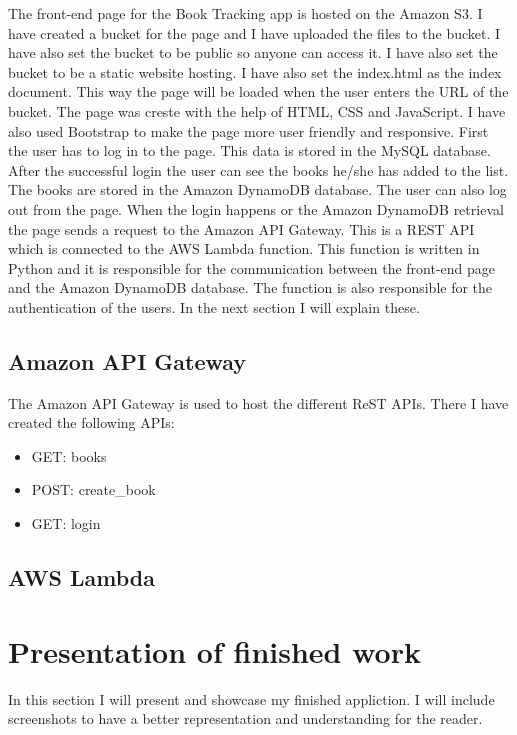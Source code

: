 \documentclass[11pt,a4paper,oneside]{report}
\begin{document}
The front-end page for the Book Tracking app is hosted on the Amazon S3. I have created a bucket for the page and I have uploaded the files to the bucket. I have also set the bucket to be public so anyone can access it. I have also set the bucket to be a static website hosting. I have also set the index.html as the index document. This way the page will be loaded when the user enters the URL of the bucket.
The page was creste with the help of HTML, CSS and JavaScript. I have also used Bootstrap to make the page more user friendly and responsive. First the user has to log in to the page.
This data is stored in the MySQL database. After the successful login the user can see the books he/she has added to the list.
The books are stored in the Amazon DynamoDB database. The user can also log out from the page.
When the login happens or the Amazon DynamoDB retrieval the page sends a request to the Amazon API Gateway. This is a REST API which is connected to the AWS Lambda function. This function is written in Python and it is responsible for the communication between the front-end page and the Amazon DynamoDB database. The function is also responsible for the authentication of the users.
In the next section I will explain these.

\section{Amazon API Gateway}

The Amazon API Gateway is used to host the different ReST APIs. There I have created the following APIs:
\begin{itemize}
  \item GET: books
  \item POST: create\_book
  \item GET: login
\end{itemize}

\section{AWS Lambda}
\chapter{Presentation of finished work}

In this section I will present and showcase my finished appliction. I will include screenshots to have a better representation and understanding for the reader.
\end{document}
